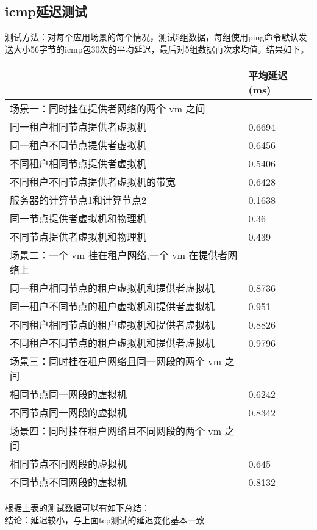 \documentclass[a4paper,left=1.5cm,right=1.5cm,11pt]{article}
\begin{document}
\subsection{icmp延迟测试}
测试方法：对每个应用场景的每个情况，测试5组数据，每组使用ping命令默认发送大小56字节的icmp包30次的平均延迟，最后对5组数据再次求均值。结果如下。
\begin{center}
\begin{tabular}[c]{|l|l|}
\hline
 &  平均延迟(ms) \\
\hline
 场景一：同时挂在提供者网络的两个 vm 之间 &  \\
\hline
 同一租户相同节点提供者虚拟机 & 0.6694 \\
\hline
 同一租户不同节点提供者虚拟机 & 0.6456 \\
 \hline
 不同租户相同节点提供者虚拟机& 0.5406 \\
 \hline
 不同租户不同节点提供者虚拟机的带宽& 0.6428 \\
 \hline
 服务器的计算节点1和计算节点2& 0.1638 \\
 \hline
 同一节点提供者虚拟机和物理机& 0.36 \\
 \hline
 不同节点提供者虚拟机和物理机& 0.439 \\
 \hline
 \hline
 场景二：一个 vm 挂在租户网络,一个 vm 在提供者网络上& \\
 \hline
 同一租户相同节点的租户虚拟机和提供者虚拟机& 0.8736 \\
 \hline
 同一租户不同节点的租户虚拟机和提供者虚拟机& 0.951 \\
 \hline
 不同租户相同节点的租户虚拟机和提供者虚拟机& 0.8826 \\
 \hline
 不同租户不同节点的租户虚拟机和提供者虚拟机& 0.9796 \\
 \hline
 \hline
 场景三：同时挂在租户网络且同一网段的两个 vm 之间& \\
 \hline
 相同节点同一网段的虚拟机& 0.6242 \\
 \hline
 不同节点同一网段的虚拟机&  0.8342\\
 \hline
 \hline
 场景四：同时挂在租户网络且不同网段的两个 vm 之间& \\
 \hline
 相同节点不同网段的虚拟机&  0.645\\
 \hline
 不同节点不同网段的虚拟机&  0.8132\\

\hline
\end{tabular}
\end{center}

根据上表的测试数据可以有如下总结：\\
结论：延迟较小，与上面tcp测试的延迟变化基本一致

\clearpage
\end{document}
